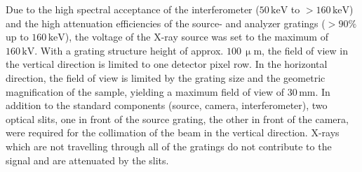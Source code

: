 \documentclass[aip,apl,amsmath,amssymb,floatfix,reprint,a4paper]{revtex4-1}
\newcommand{\unit}[1]{\ensuremath{\, \mathrm{#1}}}
\begin{document}
Due to the high spectral acceptance \cite{Weitkamp2005,Thuering2013c} of the interferometer ($50 \unit{keV}$ to $>160 \unit{keV}$) and the high attenuation efficiencies of the source- and analyzer gratings ($>90\%$ up to $160 \unit{keV}$), the voltage of the X-ray source was set to the maximum of $160 \unit{kV}$. With a grating structure height of approx. $100 \unit{\upmu m}$, the field of view in the vertical direction is limited to one detector pixel row. In the horizontal direction, the field of view is limited by the grating size and the geometric magnification of the sample, yielding a maximum field of view of $30 \unit{mm}$. In addition to the standard components (source, camera, interferometer), two optical slits, one in front of the source grating, the other in front of the camera, were required for the collimation of the beam in the vertical direction. X-rays which are not travelling through all of the gratings do not contribute to the signal and are attenuated by the slits.

\end{document}
